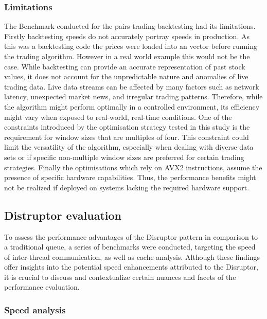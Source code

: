 \documentclass{article}
\theoremstyle{break}
\begin{document}
\subsubsection*{Limitations}
The Benchmark conducted for the pairs trading backtesting had its limitations. Firstly backtesting speeds do not accurately portray speeds in production. As this was a backtesting code the prices were loaded into an vector before running the trading algorithm. However in a real world example this would not be the case. While backtesting can provide an accurate representation of past stock values, it does not account for the unpredictable nature and anomalies of live trading data. Live data streams can be affected by many factors such as network latency, unexpected market news, and irregular trading patterns. Therefore, while the algorithm might perform optimally in a controlled environment, its efficiency might vary when exposed to real-world, real-time conditions. One of the constraints introduced by the optimisation strategy tested in this study is the requirement for window sizes that are multiples of four. This constraint could limit the versatility of the algorithm, especially when dealing with diverse data sets or if specific non-multiple window sizes are preferred for certain trading strategies. Finally the optimisations which rely on AVX2 instructions, assume the presence of specific hardware capabilities. Thus, the performance benefits might not be realized if deployed on systems lacking the required hardware support.






\subsection{Distruptor evaluation}

To assess the performance advantages of the Disruptor pattern in comparison to a traditional queue, a series of benchmarks were conducted, targeting the speed of inter-thread communication, as well as cache analysis. Although these findings offer insights into the potential speed enhancements attributed to the Disruptor, it is crucial to discuss and contextualize certain nuances and facets of the performance evaluation.



\subsubsection*{Speed analysis}
\end{document}
